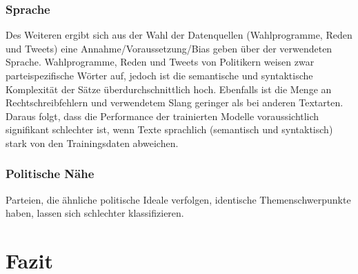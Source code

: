 \subsubsection{Sprache}


Des Weiteren ergibt sich aus der Wahl der Datenquellen (Wahlprogramme, Reden und Tweets) eine Annahme/Voraussetzung/Bias geben über der verwendeten Sprache. Wahlprogramme, Reden und Tweets von Politikern weisen zwar parteispezifische Wörter auf, jedoch ist die semantische und syntaktische Komplexität der Sätze überdurchschnittlich hoch. Ebenfalls ist die Menge an Rechtschreibfehlern und verwendetem Slang geringer als bei anderen Textarten. Daraus folgt, dass die Performance der trainierten Modelle voraussichtlich signifikant schlechter ist, wenn Texte sprachlich (semantisch und syntaktisch) stark von den Trainingsdaten abweichen.

\subsubsection{Politische Nähe}


Parteien, die ähnliche politische Ideale verfolgen, identische Themenschwerpunkte haben, lassen sich schlechter klassifizieren.

\section{Fazit} \label{sec:crispConclusion_2}
